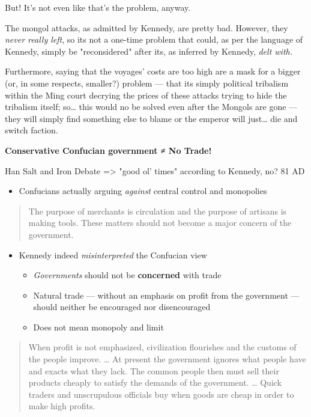 \documentclass[letterpaper]{article}
\begin{document}
But! It's not even like that's the problem, anyway.

The mongol attacks, as admitted by Kennedy, are pretty bad. However,
they \emph{never really left}, so its not a one-time problem that could, as
per the language of Kennedy, simply be "reconsidered" after its, as
inferred by Kennedy, \emph{delt with.}

Furthermore, saying that the voyages' costs are too high are a mask for
a bigger (or, in some respects, smaller?) problem --- that its simply
political tribalism within the Ming court decrying the prices of these
attacks trying to hide the tribalism itself; so\ldots{} this would no be
solved even after the Mongols are gone --- they will simply find
something else to blame or the emperor will just\ldots{} die and switch
faction.

\textbf{Conservative Confucian government ≠ No Trade!}

Han Salt and Iron Debate => "good ol' times" according to Kennedy, no?
81 AD

\begin{itemize}
\item Confucians actually arguing \emph{against} central control and monopolies
\end{itemize}

\begin{quote}
The purpose of merchants is circulation and the purpose of artisans is
making tools. These matters should not become a major concern of the
government.
\end{quote}

\begin{itemize}
\item Kennedy indeed \emph{misinterpreted} the Confucian view

\begin{itemize}
\item \emph{Governments} should not be \textbf{concerned} with trade
\item Natural trade --- without an emphasis on profit from the government
--- should neither be encouraged nor disencouraged
\item Does not mean monopoly and limit
\end{itemize}
\end{itemize}

\begin{quote}
When profit is not emphasized, civilization flourishes and the customs
of the people improve. \ldots{} At present the government ignores what
people have and exacts what they lack. The common people then must
sell their products cheaply to satisfy the demands of the government.
\ldots{} Quick traders and unscrupulous officials buy when goods are cheap
in order to make high profits.
\end{quote}
\end{document}
